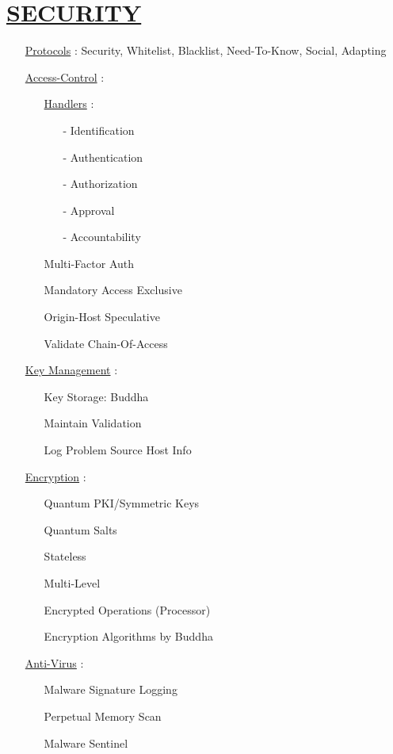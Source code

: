 \documentclass[11pt]{article}
\begin{document}
\section*{\ul{SECURITY}}
\begin{enumerate}
	\item[] \ul{Protocols} : Security, Whitelist, Blacklist, Need-To-Know, Social, Adapting
	
	\item[] \ul{Access-Control} :
	\begin{enumerate}
		\item[] \ul{Handlers} :
		\begin{enumerate}
			\item[-] Identification
			\item[-] Authentication
			\item[-] Authorization
			\item[-] Approval
			\item[-] Accountability
		\end{enumerate}
	
		\item[] Multi-Factor Auth
		\item[] Mandatory Access Exclusive
		\item[] Origin-Host Speculative
		\item[] Validate Chain-Of-Access
	\end{enumerate}

	\item[] \ul{Key Management} :
	\begin{enumerate}
		\item[] Key Storage: Buddha
		\item[] Maintain Validation
		\item[] Log Problem Source Host Info
	\end{enumerate}
	
	\item[] \ul{Encryption} :
	\begin{enumerate}
		\item[] Quantum PKI/Symmetric Keys
		\item[] Quantum Salts
		\item[] Stateless
		\item[] Multi-Level
		\item[] Encrypted Operations (Processor)
		\item[] Encryption Algorithms by Buddha %
	\end{enumerate}
	
	\item[] \ul{Anti-Virus} :
	\begin{enumerate}
		\item[] Malware Signature Logging
		\item[] Perpetual Memory Scan
		\item[] Malware Sentinel
	\end{enumerate}


\end{enumerate}
\end{document}
